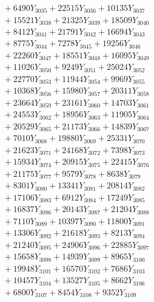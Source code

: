 \documentclass[a4paper,10pt]{article}
\begin{document}
{\begin{align}
&\;  + 6490 Y_{3035} + 22515 Y_{3036} + 10135 Y_{3037} \\[0.3ex]
&\;  + 15521 Y_{3038} + 21325 Y_{3039} + 18509 Y_{3040} \\[0.3ex]
&\;  + 8412 Y_{3041} + 21791 Y_{3042} + 16694 Y_{3043} \\[0.3ex]
&\;  + 8775 Y_{3044} + 7278 Y_{3045} + 19256 Y_{3046} \\[0.3ex]
&\;  + 22260 Y_{3047} + 18551 Y_{3048} + 16095 Y_{3049} \\[0.3ex]
&\;  + 11026 Y_{3050} + 9249 Y_{3051} + 25024 Y_{3052} \\[0.3ex]
&\;  + 22770 Y_{3053} + 11944 Y_{3054} + 9969 Y_{3055} \\[0.3ex]
&\;  + 10368 Y_{3056} + 15980 Y_{3057} + 20311 Y_{3058} \\[0.5ex]\allowbreak
&\;  + 23664 Y_{3059} + 23161 Y_{3060} + 14703 Y_{3061} \\[0.3ex]
&\;  + 24553 Y_{3062} + 18956 Y_{3063} + 11905 Y_{3064} \\[0.3ex]
&\;  + 20529 Y_{3065} + 21173 Y_{3066} + 14839 Y_{3067} \\[0.3ex]
&\;  + 7010 Y_{3068} + 19880 Y_{3069} + 25331 Y_{3070} \\[0.3ex]
&\;  + 21623 Y_{3071} + 24168 Y_{3072} + 7398 Y_{3073} \\[0.3ex]
&\;  + 15934 Y_{3074} + 20915 Y_{3075} + 22415 Y_{3076} \\[0.3ex]
&\;  + 21175 Y_{3077} + 9579 Y_{3078} + 8638 Y_{3079} \\[0.3ex]
&\;  + 8301 Y_{3080} + 13341 Y_{3081} + 20814 Y_{3082} \\[0.3ex]
&\;  + 17106 Y_{3083} + 6912 Y_{3084} + 17249 Y_{3085} \\[0.3ex]
&\;  + 16837 Y_{3086} + 20143 Y_{3087} + 21204 Y_{3088} \\[0.5ex]\allowbreak
&\;  + 7110 Y_{3089} + 10397 Y_{3090} + 11800 Y_{3091} \\[0.3ex]
&\;  + 13306 Y_{3092} + 21618 Y_{3093} + 8213 Y_{3094} \\[0.3ex]
&\;  + 21240 Y_{3095} + 24906 Y_{3096} + 22885 Y_{3097} \\[0.3ex]
&\;  + 15658 Y_{3098} + 14939 Y_{3099} + 8965 Y_{3100} \\[0.3ex]
&\;  + 19948 Y_{3101} + 16570 Y_{3102} + 7686 Y_{3103} \\[0.3ex]
&\;  + 10457 Y_{3104} + 13527 Y_{3105} + 8662 Y_{3106} \\[0.3ex]
&\;  + 6800 Y_{3107} + 8454 Y_{3108} + 9352 Y_{3109} \\[0.3ex]

\end{align}}
\end{document}
